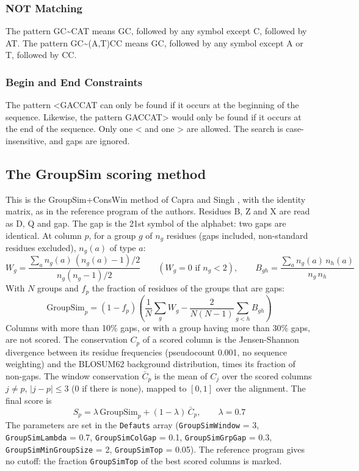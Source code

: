 \documentclass[a4paper]{article}
\begin{document}
\subsubsection{NOT Matching}
The pattern GC\textasciitilde{}CAT means GC, followed by any symbol except C, followed by AT. The pattern GC\textasciitilde{}(A,T)CC means GC, followed by any symbol except A or T, followed by CC.

\subsubsection{Begin and End Constraints}
The pattern <GACCAT can only be found if it occurs at the beginning of the sequence. Likewise, the pattern GACCAT> would only be found if it occurs at the end of the sequence. Only one < and one > are allowed. The search is case-insensitive, and gaps are ignored.

\subsection{The GroupSim scoring method}
\label{meth-groupsim}
This is the GroupSim+ConsWin method of Capra and Singh \cite{groupsim}, with the identity matrix, as in the reference program of the authors. Residues B, Z and X are read as D, Q and gap. The gap is the 21st symbol of the alphabet: two gaps are identical. At column $p$, for a group $g$ of $n_g$ residues (gaps included, non-standard residues excluded), $n_g(a)$ of type $a$:
\begin{equation}
W_g = \frac{\sum_a n_g(a)\,(n_g(a)-1)/2}{n_g(n_g-1)/2} \qquad (W_g = 0 \textrm{ if } n_g < 2), \qquad
B_{gh} = \frac{\sum_a n_g(a)\,n_h(a)}{n_g\,n_h}
\end{equation}
With $N$ groups and $f_p$ the fraction of residues of the groups that are gaps:
\begin{equation}
\mathrm{GroupSim}_p = (1-f_p)\left(\frac{1}{N}\sum_g W_g - \frac{2}{N(N-1)}\sum_{g<h} B_{gh}\right)
\end{equation}
Columns with more than 10\% gaps, or with a group having more than 30\% gaps, are not scored. The conservation $C_p$ of a scored column is the Jensen-Shannon divergence between its residue frequencies (pseudocount 0.001, no sequence weighting) and the BLOSUM62 background distribution, times its fraction of non-gaps. The window conservation $\bar{C}_p$ is the mean of $C_j$ over the scored columns $j \neq p$, $|j-p| \leq 3$ (0 if there is none), mapped to $[0,1]$ over the alignment. The final score is
\begin{equation}
S_p = \lambda\,\mathrm{GroupSim}_p + (1-\lambda)\,\bar{C}_p, \qquad \lambda = 0.7
\end{equation}
The parameters are set in the \texttt{Defauts} array (\texttt{GroupSimWindow} = 3, \texttt{GroupSimLambda} = 0.7, \texttt{GroupSimColGap} = 0.1, \texttt{GroupSimGrpGap} = 0.3, \texttt{GroupSimMinGroupSize} = 2, \texttt{GroupSimTop} = 0.05). The reference program gives no cutoff: the fraction \texttt{GroupSimTop} of the best scored columns is marked.
\end{document}
